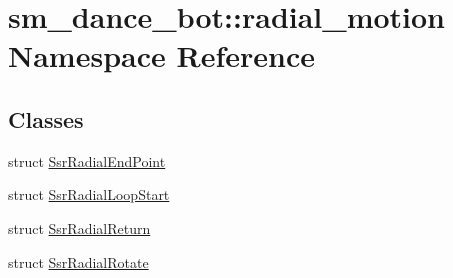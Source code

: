 \hypertarget{namespacesm__dance__bot_1_1radial__motion}{}\section{sm\+\_\+dance\+\_\+bot\+:\+:radial\+\_\+motion Namespace Reference}
\label{namespacesm__dance__bot_1_1radial__motion}
\subsection*{Classes}
\begin{DoxyCompactItemize}
\item 
struct \hyperlink{structsm__dance__bot_1_1radial__motion_1_1SsrRadialEndPoint}{Ssr\+Radial\+End\+Point}
\item 
struct \hyperlink{structsm__dance__bot_1_1radial__motion_1_1SsrRadialLoopStart}{Ssr\+Radial\+Loop\+Start}
\item 
struct \hyperlink{structsm__dance__bot_1_1radial__motion_1_1SsrRadialReturn}{Ssr\+Radial\+Return}
\item 
struct \hyperlink{structsm__dance__bot_1_1radial__motion_1_1SsrRadialRotate}{Ssr\+Radial\+Rotate}
\end{DoxyCompactItemize}
